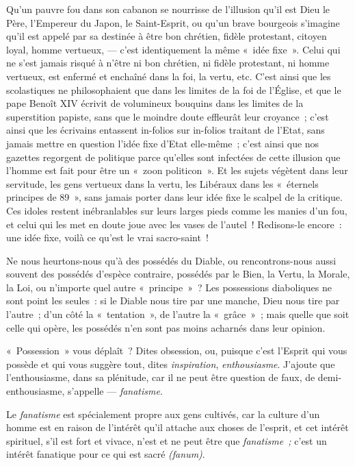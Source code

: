 \documentclass[french,twoside]{book} %
\begin{document}
Qu’un pauvre fou dans son cabanon se nourrisse de l’illusion qu’il est Dieu le Père, l’Empereur du Japon, le Saint-Esprit, ou qu’un brave bourgeois s’imagine qu’il est appelé par sa destinée à être bon chrétien, fidèle protestant, citoyen loyal, homme vertueux, — c’est identiquement la même « idée fixe ». Celui qui ne s’est jamais risqué à n’être ni bon chrétien, ni fidèle protestant, ni homme vertueux, est enfermé et enchaîné dans la foi, la vertu, etc. C’est ainsi que les scolastiques ne philosophaient que dans les limites de la foi de l’Église, et que le pape Benoît XIV écrivit de volumineux bouquins dans les limites de la superstition papiste, sans que le moindre doute effleurât leur croyance ; c’est ainsi que les écrivains entassent in-folios sur in-folios traitant de l’Etat, sans jamais mettre en question l’idée fixe d’Etat elle-même ; c’est ainsi que nos gazettes regorgent de politique parce qu’elles sont infectées de cette illusion que l’homme est fait pour être un « zoon politicon ». Et les sujets végètent dans leur servitude, les gens vertueux dans la vertu, les Libéraux dans les « éternels principes de 89 », sans jamais porter dans leur idée fixe le scalpel de la critique. Ces idoles restent inébranlables sur leurs larges pieds comme les manies d’un fou, et celui qui les met en doute joue avec les vases de l’autel ! Redisons-le encore : une idée fixe, voilà ce qu’est le vrai sacro-saint !\par
Ne nous heurtons-nous qu’à des possédés du Diable, ou rencontrons-nous aussi souvent des possédés d’espèce contraire, possédés par le Bien, la Vertu, la Morale, la Loi, ou n’importe quel autre « principe » ?  Les possessions diaboliques ne sont point les seules : si le Diable nous tire par une manche, Dieu nous tire par l’autre ; d’un côté la « tentation », de l’autre la « grâce » ; mais quelle que soit celle qui opère, les possédés n’en sont pas moins acharnés dans leur opinion.\par
« Possession » vous déplaît ? Dites obsession, ou, puisque c’est l’Esprit qui vous possède et qui vous suggère tout, dites \emph{inspiration}, \emph{enthousiasme}. J’ajoute que l’enthousiasme, dans sa plénitude, car il ne peut être question de faux, de demi-enthousiasme, s’appelle — \emph{fanatisme}.\par
Le \emph{fanatisme} est spécialement propre aux gens cultivés, car la culture d’un homme est en raison de l’intérêt qu’il attache aux choses de l’esprit, et cet intérêt spirituel, s’il est fort et vivace, n’est et ne peut être que \emph{fanatisme ;} c’est un intérêt fanatique pour ce qui est sacré \emph{(fanum)}.\par
\end{document}
